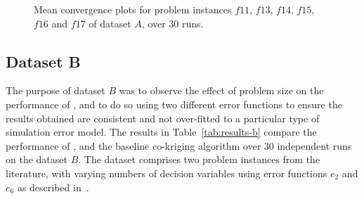 \begin{figure}[t]
  \caption{Mean convergence plots for problem instances $f11$, $f13$, $f14$, $f15$, $f16$ and $f17$ of dataset $A$, over 30 runs. } 
    \label{fig:set-a-conv}
\end{figure}

\subsection*{Dataset B}

The purpose of dataset $B$ was to observe the effect of problem size on the performance of \AlgName{}, and to do so using two different error functions to ensure the results obtained are consistent and not over-fitted to a particular type of simulation error model. The results in Table~\ref{tab:results-b} compare the performance of \AlgName{}, \motos{} and the baseline co-kriging algorithm over 30 independent runs on the dataset $B$. The dataset comprises two problem instances from the literature, with varying numbers of decision variables using error functions $e_2$ and $e_6$ as described in~\cite{wang2017generic}.

